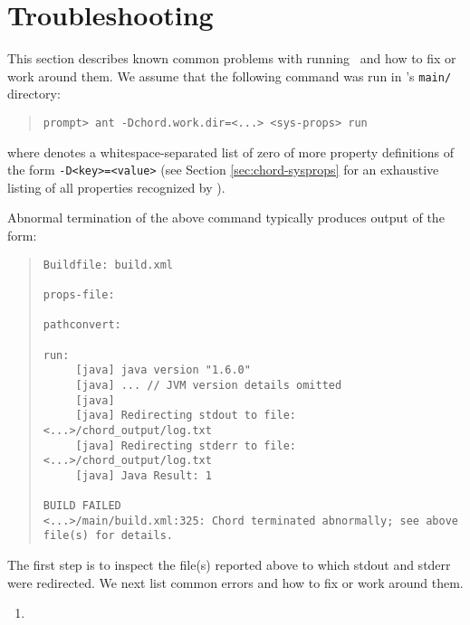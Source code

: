 \section{Troubleshooting}
\label{sec:troubleshooting}

This section describes known common problems with running \Chord\ and how to fix or work around them.
We assume that the following command was run in \Chord's {\tt main/} directory:

\begin{quote}
\begin{verbatim}
prompt> ant -Dchord.work.dir=<...> <sys-props> run
\end{verbatim}
\end{quote}

\noindent where {\tt <sys-props>} denotes a whitespace-separated list of zero of more property definitions
of the form {\tt -D<key>=<value>} (see Section \ref{sec:chord-sysprops} for an exhaustive listing of all
properties recognized by \Chord).

Abnormal termination of the above command typically produces output of the form:

\begin{quote}
\begin{verbatim}
Buildfile: build.xml

props-file:

pathconvert:

run:
     [java] java version "1.6.0"
     [java] ... // JVM version details omitted
     [java] 
     [java] Redirecting stdout to file: <...>/chord_output/log.txt
     [java] Redirecting stderr to file: <...>/chord_output/log.txt
     [java] Java Result: 1

BUILD FAILED
<...>/main/build.xml:325: Chord terminated abnormally; see above file(s) for details.
\end{verbatim}
\end{quote}

The first step is to inspect the file(s) reported above to which stdout and stderr were redirected.
We next list common errors and how to fix or work around them.

\begin{enumerate}
\item
\end{enumerate}


